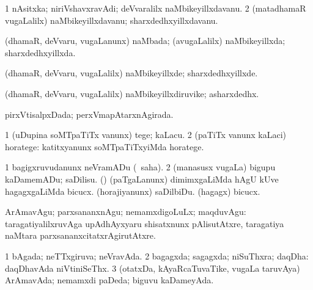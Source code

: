 {\bentry
{} 
\gl{\nA}
\expl{}
\bmng
\bnum
\num{1} nAsitxka; niriVshavxravAdi; deVvaralilx naMbikeyillxdavanu. 
\num{2} (matadhamaR \mo vugaLalilx) naMbikeyillxdavanu; sharxdedhxyillxdavanu. 
\enum
\emng
\eentry

\bentry
{} 
\gl{\gu}
\expl{}
\bmng
(dhamaR, deVvaru, \mo vugaLanunx) naMbada; (avugaLalilx) naMbikeyillxda; sharxdedhxyillxda. 
\emng
\eentry

\bentry
{} 
\gl{\kirxvi}
\expl{}
\bmng
(dhamaR, deVvaru, \mo vugaLalilx) naMbikeyillxde; sharxdedhxyillxde. 
\emng
\eentry

\bentry
{} 
\gl{\nA}
\expl{}
\bmng
(dhamaR, deVvaru, \mo vugaLalilx) naMbikeyillxdiruvike; asharxdedhx. 
\emng
\eentry

\bentry
{} 
\gl{\gu}
\expl{}
\bmng
pirxVtisalpxDada; perxVmapAtarxnAgirada. 
\emng
\eentry

\bentry
{} 
\gl{\sakirx}
\expl{}
\bmng
\bnum
\num{1} (uDupina soMTpaTiTx \mo vanunx) tege; kaLacu. 
\num{2} (paTiTx \mo vanunx kaLaci) horatege:  katitxyanunx soMTpaTiTxyiMda horatege. 
\enum
\emng
\eentry

\bentry
{} 
\gl{\kirx}


\noindent
\gl{\sakirx}
\expl{}
\bmng
\bnum
\num{1} bagigxruvudanunx neVramADu (\akirx\ saha). 
\num{2} (manasusx \mo vugaLa) bigupu kaDamemADu; saDilisu. 
 (\nw) 
\banum
{} (paTgaLanunx) dimimxgaLiMda hAgU kUve hagagxgaLiMda bicucx. 
 (horajiyanunx) saDilbiDu. 
 (hagagx) bicucx. 
\eanum
\numie
\enum
\emng

\noindent
\gl{\akirx}
\expl{}
\bmng
ArAmavAgu; parxsananxnAgu; nemamxdigoLuLx; maqduvAgu:  taragatiyalilxruvAga upAdhAyxyaru shisatxnunx pAlisutAtxre, taragatiya naMtara parxsananxcitatxrAgirutAtxre. 
\emng
\eentry

\bentry
{} 
\gl{\gu}
\expl{}
\bmng
\bnum
\num{1} bAgada; neTTxgiruva; neVravAda. 
\num{2} bagagxda; sagagxda; niSuThxra; daqDha:  daqDhavAda niVtiniSeThx. 
\num{3} (otatxDa, kAyaRcaTuvaTike, \mo vugaLa taruvAya) ArAmavAda; nemamxdi paDeda; biguvu kaDameyAda. 
\enum
\emng
\eentry

}
